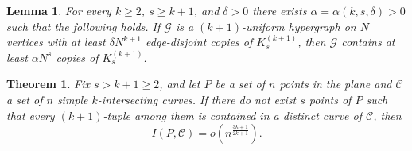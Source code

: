 \documentclass[10pt,a4paper]{amsart}
\newtheorem{theorem}{Theorem}
\newtheorem{lemma}{Lemma}
\begin{document}
\begin{lemma}\label{lem:supersat-hyper}
For every $k\ge 2$, $s\ge k+1$, and $\delta>0$ there exists
$\alpha=\alpha(k,s,\delta)>0$ such that the following holds.
If $\mathcal G$ is a $(k + 1)$-uniform hypergraph on $N$ vertices with at least
$\delta N^{k + 1}$ edge-disjoint copies of $K^{(k + 1)}_s$, then $\mathcal G$
contains at least $\alpha N^s$ copies of $K^{(k + 1)}_s$.
\end{lemma}

\begin{theorem}\label{soly}
Fix \(s>k+1\ge 2\), and let \(P\) be a set of \(n\) points in the plane and \(\mathcal C\) a set of \(n\) simple \(k\)-intersecting curves.
If there do not exist \(s\) points of \(P\) such that every \((k+1)\)-tuple among them is contained in a distinct curve of \(\mathcal C\), then
\[
I(P,\mathcal C)=o\!\left(n^{\frac{3k+1}{2k+1}}\right).
\]
\end{theorem}
\end{document}
